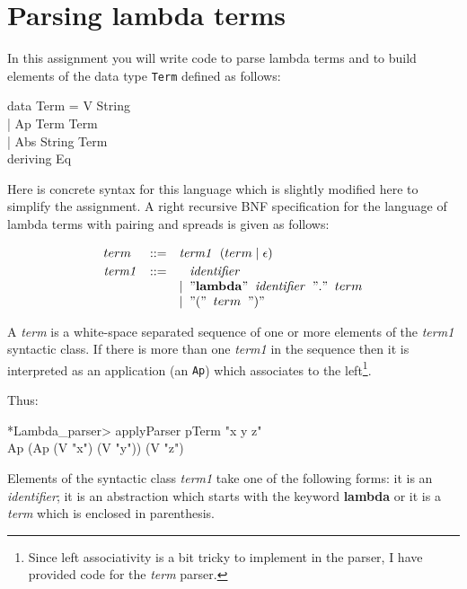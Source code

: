 \documentclass[11pt]{article}
\newcommand{\quot}[1]{"{\tt{{#1}}}"}
\begin{document}

\section{Parsing lambda terms}

In this assignment you will write code to parse lambda terms and to build
elements of the data type {\tt{Term}} defined as follows:

\begin{program*}
\>  data Term = V String \\
\>            | Ap Term Term  \\
\>            | Abs String Term  \\
\>   deriving Eq \\
\end{program*}


\noindent{} Here is concrete syntax for this language which is slightly
modified here to simplify the assignment.  A right recursive BNF specification
for the language of lambda terms with pairing and spreads is given as follows:

\[\begin{array}{lcl}
term & ::=  & {\mathit{term1}} \;\;(term \;| \;\epsilon) \vspace{.25em} \\
{\mathit{term1}} & ::= &  \;\;\; {\mathit{identifier}} \\
&& | \;\;  \quot{{\mathbf{lambda}}} \;\; {\mathit{identifier}} \;\; \quot{.} \;\; term \\
&& | \;\;  \quot{(} \;\; term \;\; \quot{)} \\
\end{array}
\]

\noindent{}A {\it{term}} is a white-space separated sequence of one or more
elements of the {\it{term1}} syntactic class.  If there is more than one
{\it{term1}} in the sequence then it is interpreted as an application (an
{\tt{Ap}}) which associates to the left\footnote{Since left associativity is a
bit tricky to implement in the parser, I have provided code for the {\it{term}}
parser.}.

\noindent{}Thus:
\begin{program*}
\> *Lambda\_parser> applyParser pTerm "x y z" \\
\> Ap (Ap (V "x") (V "y")) (V "z") \\
\end{program*}

\noindent{} Elements of the syntactic class {\it{term1}} take one of
the following forms: it is an {\it{identifier}}; it is an abstraction
which starts with the keyword {\bf{lambda}} or it is a {\it{term}}
which is enclosed in parenthesis.
\end{document}
